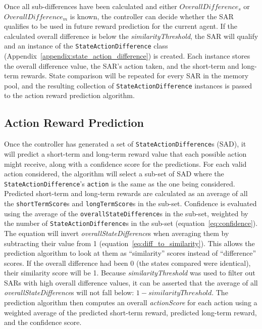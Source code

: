 Once all sub-differences have been calculated and either $OverallDifference_{s}$ or $OverallDifference_{m}$ is known, the controller can decide whether the SAR qualifies to be used in future reward prediction for the current agent.
If the calculated overall difference is below the \textit{similarityThreshold}, the SAR will qualify and an instance of the \texttt{StateActionDifference} class (Appendix~\ref{appendix:state_action_difference}) is created.
Each instance stores the overall difference value, the SAR's action taken, and the short-term and long-term rewards.
State comparison will be repeated for every SAR in the memory pool, and the resulting collection of \texttt{StateActionDifference} instances is passed to the action reward prediction algorithm.



\subsection{Action Reward Prediction}
Once the controller has generated a set of \texttt{StateActionDifference}s (SAD), it will predict a short-term and long-term reward value that each possible action might receive, along with a confidence score for the predictions.
For each valid action considered, the algorithm will select a sub-set of SAD where the \texttt{StateActionDifference}'s \texttt{action} is the same as the one being considered.
Predicted short-term and long-term rewards are calculated as an average of all the \texttt{shortTermScore}s and \texttt{longTermScore}s in the sub-set.
Confidence is evaluated using the average of the \texttt{overallStateDifference}s in the sub-set, weighted by the number of \texttt{StateActionDifference}s in the sub-set (equation~\ref{eq:confidence}).
The equation will invert \textit{overallStateDifference}s when averaging them by subtracting their value from 1 (equation~\ref{eq:diff_to_similarity}).
This allows the prediction algorithm to look at them as ``similarity'' scores instead of ``difference'' scores.
If the overall difference had been 0 (the states compared were identical), their similarity score will be 1.
Because \textit{similarityThreshold} was used to filter out SARs with high overall difference values, it can be asserted that the average of all \textit{overallStateDifference}s will not fall below: $1 - similarityThreshold$.
The prediction algorithm then computes an overall \textit{actionScore} for each action using a weighted average of the predicted short-term reward, predicted long-term reward, and the confidence score.

